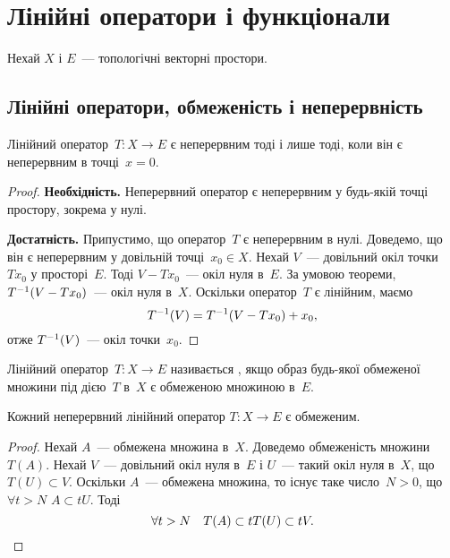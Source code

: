 \chapter{Лінійні оператори і функціонали}

Нехай $X$ і $E$~--- топологічні векторні простори.

\section{Лінійні оператори, обмеженість і неперервність}

\begin{theorem}
    \label{th:linear-continuous-functional-is-continuous-at-zero}
    Лінійний оператор~$T: X \to E$ є неперервним тоді і лише тоді, коли він є неперервним в точці~$x = 0$.
\end{theorem}

\begin{proof}
    \textbf{Необхідність.} Неперервний оператор є неперервним у будь-якій точці простору, зокрема у нулі.

    \textbf{Достатність.} Припустимо, що оператор~$T$ є неперервним в нулі. Доведемо, що він є неперервним у довільній точці~$x_0 \in X$. Нехай $V$~--- довільний окіл точки~$T x_0$ у просторі~$E$. Тоді $V - T x_0$~--- окіл нуля в~$E$. За умовою теореми, $T^{-1}(V - T x_0)$~--- окіл нуля в~$X$. Оскільки оператор~$T$ є лінійним, маємо
    \begin{equation*}
        T^{-1}(V) = T^{-1}(V - T x_0) + x_0,
    \end{equation*}
    отже $T^{-1}(V)$~--- окіл точки~$x_0$.
\end{proof}

\begin{definition}
    Лінійний оператор~$T: X \to E$ називається , якщо образ будь-якої обмеженої множини під дією~$T$ в~$X$ є обмеженою множиною в~$E$.
\end{definition}

\begin{theorem}
    \label{th:linear-continuous-functional-is-bounded}
    Кожний неперервний лінійний оператор $T: X \to E$ є обмеженим.
\end{theorem}

\begin{proof}
    Нехай $A$~--- обмежена множина в~$X$. Доведемо обмеженість множини~$T(A)$. Нехай $V$~--- довільний окіл нуля в~$E$ і $U$~--- такий окіл нуля в~$X$, що $T(U) \subset V$. Оскільки $A$~--- обмежена множина, то існує таке число~$N > 0$, що $\forall t > N$ $A \subset t U$. Тоді
    \begin{equation*}
        \forall t > N \quad T(A) \subset t T(U) \subset t V. \qedhere
    \end{equation*}
\end{proof}

